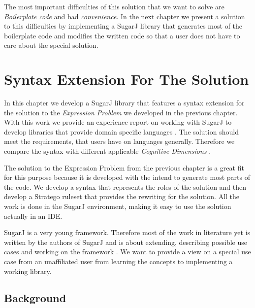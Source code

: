 \documentclass{report}
\begin{document}
The most important difficulties of this solution that we want to solve are \emph{Boilerplate code} and bad \emph{convenience}. In the next chapter we present a solution to this difficulties by implementing a SugarJ library that generates most of the boilerplate code and modifies the written code so that a user does not have to care about the special solution.











\chapter{Syntax Extension For The Solution}

In this chapter we develop a SugarJ library that features a syntax extension for the solution to the \emph{Expression Problem} we developed in the previous chapter. With this work we provide an experience report on working with SugarJ to develop libraries that provide domain specific languages \cite{Erdweg-SugarJ-2011}. The solution should meet the requirements, that users have on languages generally. Therefore we compare the syntax with different applicable \emph{Cognitive Dimensions} \cite{Green-Cognitive-1996}.

The solution to the Expression Problem from the previous chapter is a great fit for this purpose because it is developed with the intend to generate most parts of the code. We develop a syntax that represents the roles of the solution and then develop a Stratego ruleset that provides the rewriting for the solution. All the work is done in the SugarJ environment, making it easy to use the solution actually in an IDE.

SugarJ is a very young framework. Therefore most of the work in literature yet is written by the authors of SugarJ and is about extending, describing possible use cases and working on the framework \cite{Fehrenbach-Retrofitting-2011, Erdweg-Composition-2012, Erdweg-Editor-2011, Erdweg-SugarHaskell-2012, Erdweg-Questionnaire-2013}. We want to provide a view on a special use case from an unaffiliated user from learning the concepts to implementing a working library.


\section{Background}
\end{document}
